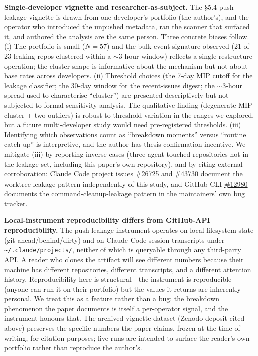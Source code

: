\documentclass[12pt]{article}
\begin{document}
\textbf{Single-developer vignette and researcher-as-subject.} The §5.4 push-leakage vignette is drawn from one developer's portfolio (the author's), and the operator who introduced the unpushed metadata, ran the scanner that surfaced it, and authored the analysis are the same person. Three concrete biases follow. (i) The portfolio is small ($N=57$) and the bulk-event signature observed (21 of 23 leaking repos clustered within a $\sim$3-hour window) reflects a single restructure operation; the cluster shape is informative about the mechanism but not about base rates across developers. (ii) Threshold choices (the 7-day MIP cutoff for the leakage classifier; the 30-day window for the recent-issues digest; the $\sim$3-hour spread used to characterise ``cluster'') are presented descriptively but not subjected to formal sensitivity analysis. The qualitative finding (degenerate MIP cluster + two outliers) is robust to threshold variation in the ranges we explored, but a future multi-developer study would need pre-registered thresholds. (iii) Identifying which observations count as ``breakdown moments'' versus ``routine catch-up'' is interpretive, and the author has thesis-confirmation incentive. We mitigate (iii) by reporting inverse cases (three agent-touched repositories not in the leakage set, including this paper's own repository), and by citing external corroboration: Claude Code project issues \href{https://github.com/anthropics/claude-code/issues/26725}{\#26725} and \href{https://github.com/anthropics/claude-code/issues/43730}{\#43730} document the worktree-leakage pattern independently of this study, and GitHub CLI \href{https://github.com/cli/cli/issues/12980}{\#12980} documents the command-cleanup-leakage pattern in the maintainers' own bug tracker.

\textbf{Local-instrument reproducibility differs from GitHub-API reproducibility.} The push-leakage instrument operates on local filesystem state (git ahead/behind/dirty) and on Claude Code session transcripts under \texttt{\textasciitilde/.claude/projects/}, neither of which is queryable through any third-party API. A reader who clones the artifact will see different numbers because their machine has different repositories, different transcripts, and a different attention history. Reproducibility here is structural---the instrument is reproducible (anyone can run it on their portfolio) but the values it returns are inherently personal. We treat this as a feature rather than a bug: the breakdown phenomenon the paper documents is itself a per-operator signal, and the instrument honours that. The archived vignette dataset (Zenodo deposit cited above) preserves the specific numbers the paper claims, frozen at the time of writing, for citation purposes; live runs are intended to surface the reader's own portfolio rather than reproduce the author's.
\end{document}
